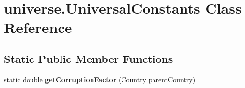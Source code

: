 \hypertarget{classuniverse_1_1_universal_constants}{}\section{universe.\+Universal\+Constants Class Reference}
\label{classuniverse_1_1_universal_constants}
\subsection*{Static Public Member Functions}
\begin{DoxyCompactItemize}
\item 
static double {\bfseries get\+Corruption\+Factor} (\hyperlink{classplanets_1_1_country}{Country} parent\+Country)\hypertarget{classuniverse_1_1_universal_constants_ac76b9dea5666299e9b3b25bf7fcde7ed}{}\label{classuniverse_1_1_universal_constants_ac76b9dea5666299e9b3b25bf7fcde7ed}

\end{DoxyCompactItemize}
